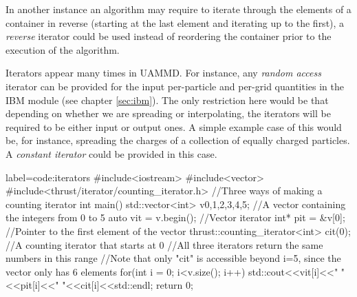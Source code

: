 \documentclass[twoside,openright,titlepage,numbers=noenddot,%
headinclude,footinclude,cleardoublepage=empty,abstract=on,
BCOR=5mm,fontsize=11pt, dvipsnames, paper=b5
]{scrreprt}
\newcommand{\uammd}{\gls{UAMMD}\xspace}
\begin{document}
In another instance an algorithm may require to iterate through the elements of a container in reverse (starting at the last element and iterating up to the first), a \emph{reverse} iterator could be used instead of reordering the container prior to the execution of the algorithm.

Iterators appear many times in \uammd. For instance, any \emph{random access} iterator can be provided for the input per-particle and per-grid quantities in the \gls{IBM} module (see chapter \ref{sec:ibm}). The only restriction here would be that depending on whether we are spreading or interpolating, the iterators will be required to be either input or output ones. A simple example case of this would be, for instance, spreading the charges of a collection of equally charged particles. A \emph{constant iterator} could be provided in this case.

\begin{code2} {label=code:iterators}
#include<iostream>
#include<vector>
#include<thrust/iterator/counting_iterator.h>
//Three ways of making a counting iterator
int main(){
  std::vector<int> v{0,1,2,3,4,5}; //A vector containing the integers from 0 to 5
  auto vit = v.begin(); //Vector iterator
  int* pit = &v[0];     //Pointer to the first element of the vector
  thrust::counting_iterator<int> cit(0); //A counting iterator that starts at 0
  //All three iterators return the same numbers in this range
  //Note that only "cit" is accessible beyond i=5, since the vector only has 6 elements
  for(int i = 0; i<v.size(); i++){
    std::cout<<vit[i]<<" "<<pit[i]<<" "<<cit[i]<<std::endl;
  }
  return 0;
}
\end{code2}
\end{document}
